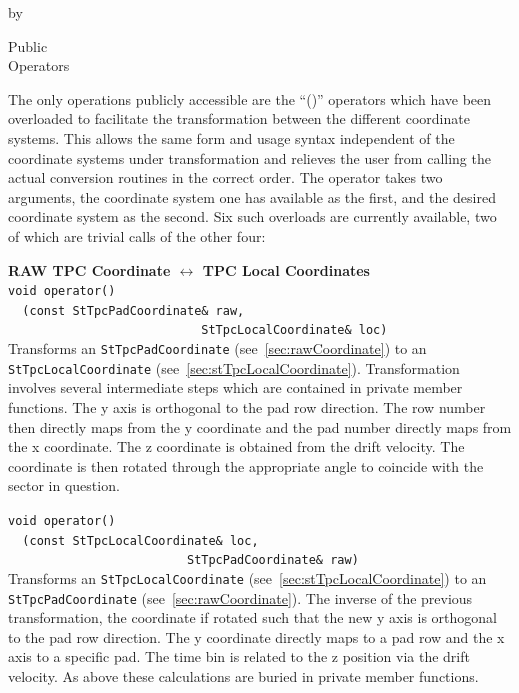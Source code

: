 \documentclass[twoside]{article}
\newcommand{\comp}[1]{\texttt{#1}}%
\newcommand{\entrylabel}[1]{\mbox{\textbf{{#1}}}\hfil}%
\newenvironment{entry}
{\begin{list}{}%
    {\renewcommand{\makelabel}{\entrylabel}%
     \setlength{\labelwidth}{90pt}%
     \setlength{\leftmargin}{\labelwidth}
     \advance\leftmargin by \labelsep%
      }%
    }%
  {\end{list}}
\newcommand{\Entrylabel}[1]%
{\raisebox{0pt}[1ex][0pt]{\makebox[\labelwidth][l]%
    {\parbox[t]{\labelwidth}{\hspace{0pt}\textbf{{#1}}}}}}
\newenvironment{Entry}%
{\renewcommand{\entrylabel}{\Entrylabel}\begin{entry}}%
  {\end{entry}}
\begin{document}
\begin{Entry}
\item[Public \\ Operators]

   The only operations publicly accessible are the ``()''
   operators which have
   been overloaded to facilitate the transformation between the
   different coordinate systems.  This allows the same form and usage
   syntax independent of the coordinate systems under transformation
   and relieves the user from calling the actual conversion routines 
   in the correct order.  The operator takes two arguments, the 
   coordinate system one has available as the first, and the 
   desired coordinate system as the second.
   Six such overloads are currently available,
   two of which are trivial calls of the other four:

   {\bf RAW TPC Coordinate $\leftrightarrow$ TPC Local Coordinates} \\
   \verb+void operator()+\\
   \verb+  (const StTpcPadCoordinate& raw, +\\
   \verb+                           StTpcLocalCoordinate& loc)+\\
   Transforms an \comp{StTpcPadCoordinate} (see~\ref{sec:rawCoordinate})
   to an \comp{StTpcLocalCoordinate} (see~\ref{sec:stTpcLocalCoordinate}).
   Transformation involves several intermediate steps which are
   contained in private member functions.  
   The y axis is orthogonal to the pad
   row direction.  The row number then directly maps from the
   y coordinate and the pad number directly maps from the x coordinate.
   The z coordinate is obtained from the drift velocity.  The coordinate
   is then rotated through the appropriate angle to coincide with the
   sector in question.

   \verb+void operator()+\\
   \verb+  (const StTpcLocalCoordinate& loc,+\\
   \verb+                         StTpcPadCoordinate& raw)+\\
   Transforms an \comp{StTpcLocalCoordinate} (see~\ref{sec:stTpcLocalCoordinate})
   to an \comp{StTpcPadCoordinate} (see~\ref{sec:rawCoordinate}).  The
   inverse of the previous transformation, the coordinate if rotated
   such that the new y axis is orthogonal to the pad row direction.  
   The y coordinate directly maps to a pad row and the x axis to
   a specific pad.  The time bin is related to the z position via
   the drift velocity.  As above these calculations are buried in
   private member functions.


\end{Entry}
\end{document}
